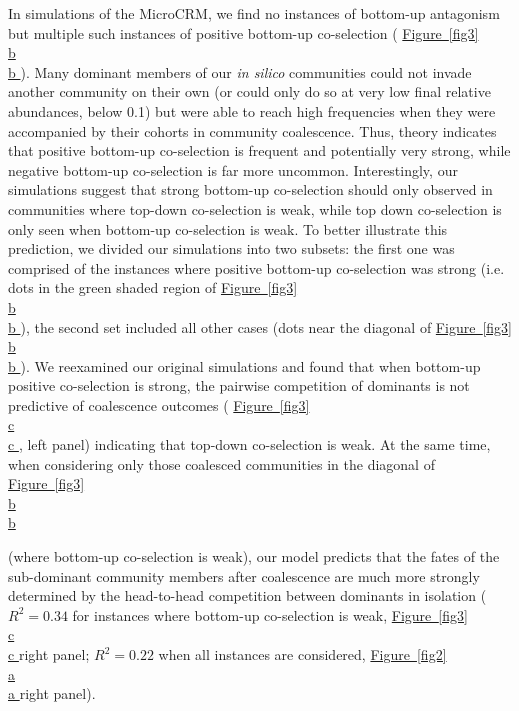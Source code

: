 \documentclass[a4paper,10pt]{article}
\newcommand{\figref}[2][]{%
  \hyperref[{#2}]{%
    Figure~\ref*{#2}%
    \ifx\\#1\\%
    \else
      #1%
    \fi
  }%
}
\begin{document}
In simulations of the MicroCRM, we find no instances of bottom-up antagonism
but multiple such instances of positive bottom-up co-selection
(\figref[b]{fig3}).
Many dominant members of our \textit{in silico} communities
could not invade another community on their own
(or could only do so at very low final relative abundances, below 0.1)
but were able to reach high frequencies when they were accompanied by their cohorts
in community coalescence.
Thus, theory indicates that positive bottom-up co-selection is frequent and potentially very strong,
while negative bottom-up co-selection is far more uncommon.
Interestingly, our simulations suggest that strong bottom-up co-selection
should only observed in communities where top-down co-selection is weak,
while top down co-selection is only seen when bottom-up co-selection is weak.
To better illustrate this prediction,
we divided our simulations into two subsets:
the first one was comprised of the instances where positive bottom-up co-selection was strong
(i.e. dots in the green shaded region of \figref[b]{fig3}),
the second set included all other cases
(dots near the diagonal of \figref[b]{fig3}).
We reexamined our original simulations and
found that when bottom-up positive co-selection is strong,
the pairwise competition of dominants is not predictive of coalescence outcomes
(\figref[c]{fig3}, left panel)
indicating that top-down co-selection is weak.
At the same time, when considering only those coalesced communities in the diagonal of \figref[b]{fig3}
(where bottom-up co-selection is weak),
our model predicts that the fates of the sub-dominant community members
after coalescence are much more strongly determined by the head-to-head competition between dominants in isolation
($R^2=0.34$ for instances where bottom-up co-selection is weak, \figref[c]{fig3} right panel;
$R^2=0.22$ when all instances are considered, \figref[a]{fig2} right panel).
\end{document}
